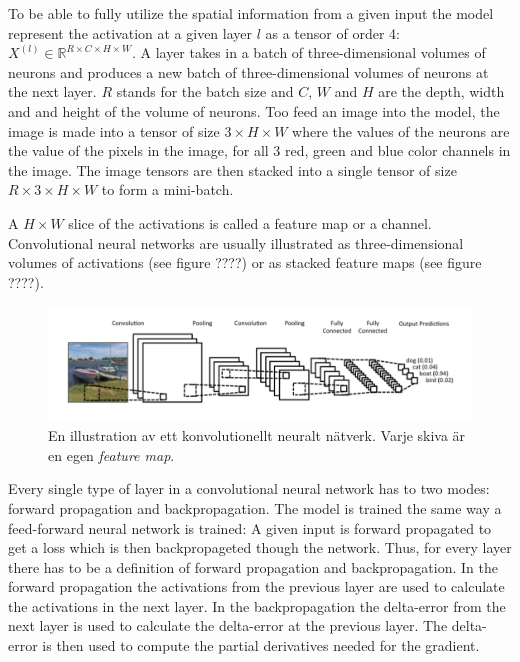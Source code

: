 \documentclass[a4paper,11pt,twoside]{article}
\begin{document}
To be able to fully utilize the spatial information from a given input the model represent the activation at a given layer $l$ as a tensor of order 4: $X^{(l)} \in \mathbb{R}^{R \times C  \times H \times W}$. A layer takes in a batch of three-dimensional volumes of neurons and produces a new batch of three-dimensional volumes of neurons at the next layer. $R$ stands for the batch size and $C$, $W$ and $H$ are the depth, width and and height of the volume of neurons. Too feed an image into the model, the image is made into a tensor of size $3 \times H \times W$ where the values of the neurons are the value of the pixels in the image, for all 3 red, green and blue color channels in the image. The image tensors are then stacked into a single tensor of size $R \times 3 \times H \times W$ to form a mini-batch.

A $H \times W$ slice of the activations is called a feature map or a channel. Convolutional neural networks are usually illustrated as three-dimensional volumes of activations (see figure ????) or as stacked feature maps (see figure ????). 

\begin{figure}[h]\label{figboatcnn}
	\centering
  		\includegraphics[scale=0.6]{boatcnn.png}
  	\caption{En illustration av ett konvolutionellt neuralt nätverk. Varje skiva är en egen \textit{feature map}. \cite{figboatcnn}}
\end{figure}

Every single type of layer in a convolutional neural network has to two modes: forward propagation and backpropagation. The model is trained the same way a feed-forward neural network is trained: A given input is forward propagated to get a loss which is then backpropageted though the network. Thus, for every layer there has to be a definition of forward propagation and backpropagation. In the forward propagation the activations from the previous layer are used to calculate the activations in the next layer. In the backpropagation the delta-error from the next layer is used to calculate the delta-error at the previous layer. The delta-error is then used to compute the partial derivatives needed for the gradient.
\end{document}
